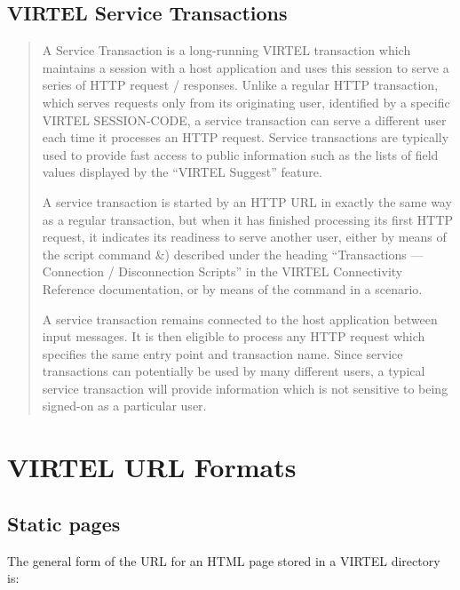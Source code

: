 \documentclass[letterpaper,10pt,english]{sphinxmanual}
\begin{document}
\subsection{VIRTEL Service Transactions}
\label{\detokenize{User_Guide:virtel-service-transactions}}\label{\detokenize{User_Guide:index-2}}\begin{quote}

A Service Transaction is a long-running VIRTEL transaction which
maintains a session with a host application and uses this session to
serve a series of HTTP request / responses. Unlike a regular HTTP
transaction, which serves requests only from its originating user,
identified by a specific VIRTEL SESSION-CODE, a service transaction
can serve a different user each time it processes an HTTP request.
Service transactions are typically used to provide fast access to
public information such as the lists of field values displayed by
the “VIRTEL Suggest” feature.

A service transaction is started by an HTTP URL in exactly the same
way as a regular transaction, but when it has finished processing
its first HTTP request, it indicates its readiness to serve another
user, either by means of the script command \&) described under the
heading “Transactions — Connection / Disconnection Scripts” in the
VIRTEL Connectivity Reference documentation, or by means of the {\hyperref[\detokenize{User_Guide:v457ug-action-serve-another-users}]{}} command in a scenario.

A service transaction remains connected to the host application
between input messages. It is then eligible to process any HTTP
request which specifies the same entry point and transaction name.
Since service transactions can potentially be used by many different
users, a typical service transaction will provide information which
is not sensitive to being signed-on as a particular user.
\end{quote}


\section{VIRTEL URL Formats}
\label{\detokenize{User_Guide:virtel-url-formats}}\label{\detokenize{User_Guide:v457ug-url-formats}}

\subsection{Static pages}
\label{\detokenize{User_Guide:static-pages}}
The general form of the URL for an HTML page stored in a VIRTEL directory is:
\end{document}
